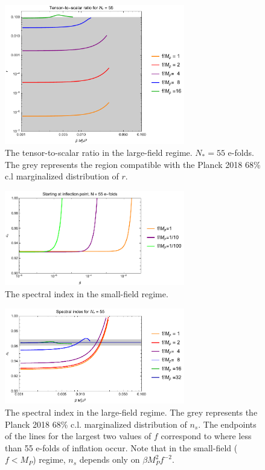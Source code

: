 \documentclass[aps,amsfonts,amsmath,prd,preprint,nofootinbib,superscriptaddress]{revtex4}
\newcommand{\Mp}{{M_{P}}}
\newcommand{\MMp}{{M_P^2}}
\begin{document}
\begin{figure}[!h]
  \centering
    \includegraphics[width=0.7\textwidth]{figures/rvsb.pdf}
    \caption{The tensor-to-scalar ratio in the large-field regime.  $N_\ast = 55$ e-folds. The grey represents the region compatible
    with the Planck 2018 68\% c.l marginalized distribution of $r$.}
\end{figure}


\begin{figure}[!h]
  \centering
    \includegraphics[width=0.7\textwidth]{figures/nsvsbetaplot2.pdf}
    \caption{The spectral index in the small-field regime.}
\end{figure}

\begin{figure}[!h]
  \centering
    \includegraphics[width=0.7\textwidth]{figures/nsvsb.pdf}
    \caption{The spectral index in the large-field regime. The grey represents the Planck 2018 68\% c.l. marginalized distribution of $n_s$.  The endpoints of the lines for the largest two values of $f$ correspond to where less than 55 e-folds of inflation occur.
    Note that in the small-field ($f < \Mp$) regime, $n_s$ depends only on $\beta \MMp f^{-2}$.}\label{fig:nsvsboff}
\end{figure}
\end{document}
